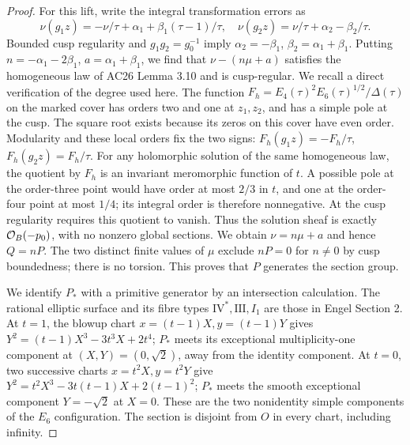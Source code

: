 \begin{proof}
For this lift, write the integral transformation errors as
\[
\nu(g_1z)=-\nu/\tau+\alpha_1+\beta_1(\tau-1)/\tau,
\quad
\nu(g_2z)=\nu/\tau+\alpha_2-\beta_2/\tau.
\]
Bounded cusp regularity and $g_1g_2=g_0^{-1}$ imply
$\alpha_2=-\beta_1$, $\beta_2=\alpha_1+\beta_1$.
Putting $n=-\alpha_1-2\beta_1$, $a=\alpha_1+\beta_1$, we find that
$\nu-(n\mu+a)$ satisfies the homogeneous law of AC26 Lemma 3.10
and is cusp-regular.  We recall a direct verification of the degree
used here.  The function
$F_h=E_4(\tau)^2E_6(\tau)^{1/2}/\Delta(\tau)$ on the marked cover
has orders two and one at $z_1,z_2$, and has a simple pole at the
cusp.  The square root exists because its zeros on this cover have
even order.  Modularity and these local orders fix the two signs:
$F_h(g_1z)=-F_h/\tau$, $F_h(g_2z)=F_h/\tau$.
For any holomorphic solution of the same homogeneous law, the
quotient by $F_h$ is an invariant meromorphic function of $t$.
A possible pole at the order-three point would have order at most
$2/3$ in $t$, and one at the order-four point at most $1/4$; its
integral order is therefore nonnegative.  At the cusp regularity
requires this quotient to vanish.  Thus the solution sheaf is
exactly $\mathcal O_B(-p_0)$, with no nonzero global sections.
We obtain $\nu=n\mu+a$ and hence $Q=nP$.  The two distinct
finite values of $\mu$ exclude $nP=0$ for $n\ne0$ by cusp boundedness;
there is no torsion.  This proves that $P$ generates the section group.

We identify $P_*$ with a primitive generator by an intersection
calculation.  The rational elliptic surface and its fibre types
$\mathrm{IV}^*,\mathrm{III},I_1$ are those in Engel Section 2.
At $t=1$, the blowup chart $x=(t-1)X,y=(t-1)Y$ gives
$Y^2=(t-1)X^3-3t^3X+2t^4$; $P_*$ meets its exceptional
multiplicity-one component at $(X,Y)=(0,\sqrt2)$, away from the
identity component.  At $t=0$, two successive charts
$x=t^2X,y=t^2Y$ give
$Y^2=t^2X^3-3t(t-1)X+2(t-1)^2$; $P_*$ meets the smooth exceptional
component $Y=-\sqrt2$ at $X=0$.  These are the two nonidentity
simple components of the $E_6$ configuration.  The section is
disjoint from $O$ in every chart, including infinity.


\end{proof}
